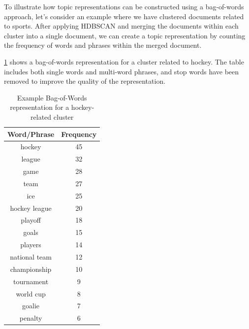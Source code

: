 To illustrate how topic representations can be constructed using a bag-of-words approach, let's consider an example where we have clustered documents related to sports. After applying HDBSCAN and merging the documents within each cluster into a single document, we can create a topic representation by counting the frequency of words and phrases within the merged document.

\cref{tab:hockey_cluster} shows a bag-of-words representation for a cluster related to hockey. The table includes both single words and multi-word phrases, and stop words have been removed to improve the quality of the representation.


\begin{table}[h]
    \centering
    \begin{tabular}{|c|c|}
        \hline
        \textbf{Word/Phrase} & \textbf{Frequency} \\
        \hline
        hockey               & 45                 \\
        league               & 32                 \\
        game                 & 28                 \\
        team                 & 27                 \\
        ice                  & 25                 \\
        hockey league        & 20                 \\
        playoff              & 18                 \\
        goals                & 15                 \\
        players              & 14                 \\
        national team        & 12                 \\
        championship         & 10                 \\
        tournament           & 9                  \\
        world cup            & 8                  \\
        goalie               & 7                  \\
        penalty              & 6                  \\
        \hline
    \end{tabular}
    \caption{Example Bag-of-Words representation for a hockey-related cluster}
    \label{tab:hockey_cluster}
\end{table}

